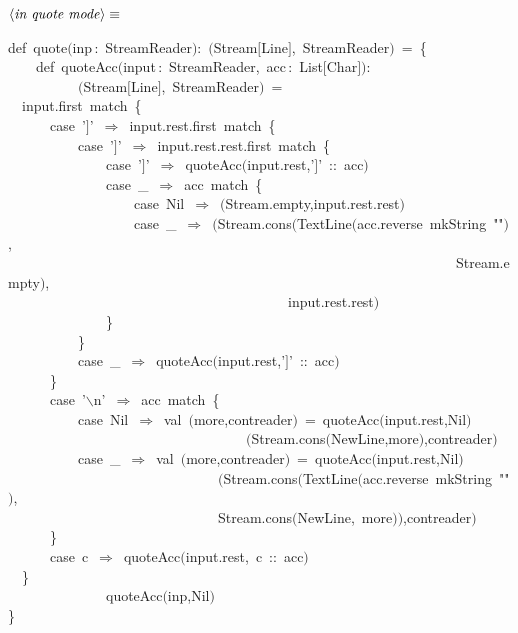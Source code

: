 \documentclass[a4paper,12pt]{article}
\begin{document}
$\left<\mbox{\emph{in quote mode}}\right>\equiv$
\begin{program}{\vem def}~quote$($inp\,{\rm :}~StreamReader$)${\rm :}~$($Stream$[$Line$]$,~StreamReader$)$~=~{\small\{}
\\~~~~{\vem def}~quoteAcc$($input\,{\rm :}~StreamReader,~acc\,{\rm :}~List$[$Char$]$$)${\rm :}
\\~~~~~~~~~~$($Stream$[$Line$]$,~StreamReader$)$~=
\\~~input.first~{\vem match}~{\small\{}
\\~~~~~~{\vem case}~'$]$'~$\Rightarrow$~input.rest.first~{\vem match}~{\small\{}
\\~~~~~~~~~~{\vem case}~'$]$'~$\Rightarrow$~input.rest.rest.first~{\vem match}~{\small\{}
\\~~~~~~~~~~~~~~{\vem case}~'$]$'~$\Rightarrow$~quoteAcc$($input.rest,'$]$'~{\rm :}{\rm :}~acc$)$
\\~~~~~~~~~~~~~~{\vem case}~\_~$\Rightarrow$~acc~{\vem match}~{\small\{}
\\~~~~~~~~~~~~~~~~~~{\vem case}~Nil~$\Rightarrow$~$($Stream.empty,input.rest.rest$)$
\\~~~~~~~~~~~~~~~~~~{\vem case}~\_~$\Rightarrow$~$($Stream.cons$($TextLine$($acc.reverse~mkString~""$)$,
\\~~~~~~~~~~~~~~~~~~~~~~~~~~~~~~~~~~~~~~~~~~~~~~~~~~~~~~~~~~~~~~~~Stream.empty$)$,
\\~~~~~~~~~~~~~~~~~~~~~~~~~~~~~~~~~~~~~~~~input.rest.rest$)$
\\~~~~~~~~~~~~~~{\small\}}
\\~~~~~~~~~~{\small\}}
\\~~~~~~~~~~{\vem case}~\_~$\Rightarrow$~quoteAcc$($input.rest,'$]$'~{\rm :}{\rm :}~acc$)$
\\~~~~~~{\small\}}
\\~~~~~~{\vem case}~'$\backslash$n'~$\Rightarrow$~acc~{\vem match}~{\small\{}
\\~~~~~~~~~~{\vem case}~Nil~$\Rightarrow$~{\vem val}~$($more,contreader$)$~=~quoteAcc$($input.rest,Nil$)$
\\~~~~~~~~~~~~~~~~~~~~~~~~~~~~~~~~~~$($Stream.cons$($NewLine,more$)$,contreader$)$
\\~~~~~~~~~~{\vem case}~\_~$\Rightarrow$~{\vem val}~$($more,contreader$)$~=~quoteAcc$($input.rest,Nil$)$
\\~~~~~~~~~~~~~~~~~~~~~~~~~~~~~~$($Stream.cons$($TextLine$($acc.reverse~mkString~""$)$,
\\~~~~~~~~~~~~~~~~~~~~~~~~~~~~~~Stream.cons$($NewLine,~more$)$$)$,contreader$)$
\\~~~~~~{\small\}}
\\~~~~~~{\vem case}~c~$\Rightarrow$~quoteAcc$($input.rest,~c~{\rm :}{\rm :}~acc$)$
\\~~{\small\}}
\\~~~~~~~~~~~~~~quoteAcc$($inp,Nil$)$
\\{\small\}}
\\[0.5em]\end{program}
\end{document}
